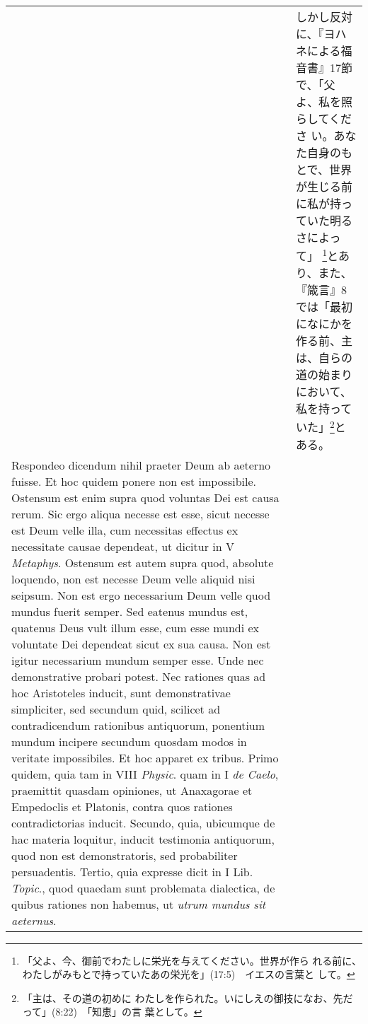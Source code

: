 \documentclass[10pt]{jsarticle} %
\begin{document}
\begin{longtable}{p{21em}p{21em}}
&

しかし反対に、『ヨハネによる福音書』17節で、「父よ、私を照らしてくださ
い。あなた自身のもとで、世界が生じる前に私が持っていた明るさによって」
\footnote {「父よ、今、御前でわたしに栄光を与えてください。世界が作ら
れる前に、わたしがみもとで持っていたあの栄光を」(17:5)　イエスの言葉と
して。}とあり、また、『箴言』8では「最初になにかを作る前、主は、自らの
道の始まりにおいて、私を持っていた」\footnote {「主は、その道の初めに
わたしを作られた。いにしえの御技になお、先だって」(8:22)　「知恵」の言
葉として。}とある。


\\



{\sc Respondeo dicendum} nihil praeter Deum ab aeterno fuisse. Et hoc
 quidem ponere non est impossibile. Ostensum est enim supra quod
 voluntas Dei est causa rerum. Sic ergo aliqua necesse est esse, sicut
 necesse est Deum velle illa, cum necessitas effectus ex necessitate
 causae dependeat, ut dicitur in V {\it Metaphys}. Ostensum est autem
 supra quod, absolute loquendo, non est necesse Deum velle aliquid nisi
 seipsum. Non est ergo necessarium Deum velle quod mundus fuerit
 semper. Sed eatenus mundus est, quatenus Deus vult illum esse, cum esse
 mundi ex voluntate Dei dependeat sicut ex sua causa. Non est igitur
 necessarium mundum semper esse. Unde nec demonstrative probari
 potest. Nec rationes quas ad hoc Aristoteles inducit, sunt
 demonstrativae simpliciter, sed secundum quid, scilicet ad
 contradicendum rationibus antiquorum, ponentium mundum incipere
 secundum quosdam modos in veritate impossibiles. Et hoc apparet ex
 tribus. Primo quidem, quia tam in VIII {\it Physic}. quam in I {\it de
 Caelo}, praemittit quasdam opiniones, ut Anaxagorae et Empedoclis et
 Platonis, contra quos rationes contradictorias inducit. Secundo, quia,
 ubicumque de hac materia loquitur, inducit testimonia antiquorum, quod
 non est demonstratoris, sed probabiliter persuadentis. Tertio, quia
 expresse dicit in I Lib. {\it Topic}., quod quaedam sunt problemata
 dialectica, de quibus rationes non habemus, ut {\it utrum mundus sit
 aeternus}.

&


\end{longtable}
\end{document}
